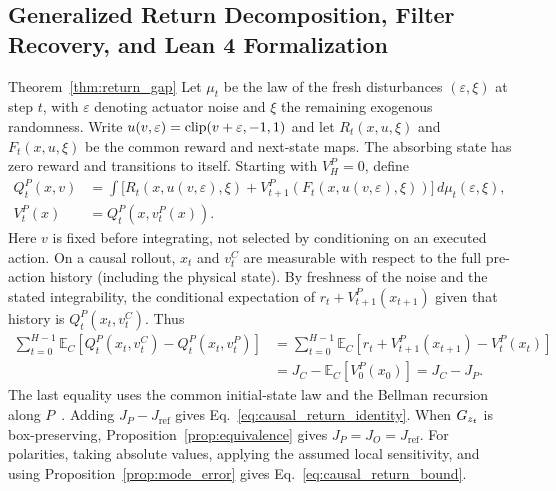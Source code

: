 \subsection{Generalized Return Decomposition, Filter Recovery, and Lean 4 Formalization}
\label{app:return_proof}

\begin{proofof}{Theorem~\ref{thm:return_gap}}
Let $\mu_t$ be the law of the fresh disturbances $(\varepsilon,\xi)$ at step $t$, with $\varepsilon$ denoting actuator noise and $\xi$ the remaining exogenous randomness. Write $u(v,\varepsilon)=\operatorname{clip}(v+\varepsilon,-1,1)$ and let $R_t(x,u,\xi)$ and $F_t(x,u,\xi)$ be the common reward and next-state maps. The absorbing state has zero reward and transitions to itself. Starting with $V_H^P=0$, define
\begin{align*}
 Q_t^P(x,v) &= \int \bigl[R_t(x,u(v,\varepsilon),\xi)
    + V_{t+1}^P(F_t(x,u(v,\varepsilon),\xi))\bigr]\,d\mu_t(\varepsilon,\xi),\\
 V_t^P(x) &= Q_t^P(x,v_t^P(x)).
\end{align*}
Here $v$ is fixed before integrating, not selected by conditioning on an executed action. On a causal rollout, $x_t$ and $v_t^C$ are measurable with respect to the full pre-action history (including the physical state). By freshness of the noise and the stated integrability, the conditional expectation of $r_t+V_{t+1}^P(x_{t+1})$ given that history is $Q_t^P(x_t,v_t^C)$. Thus
\begin{align*}
 \sum_{t=0}^{H-1}\mathbb{E}_C[Q_t^P(x_t,v_t^C)-Q_t^P(x_t,v_t^P)]
 &= \sum_{t=0}^{H-1}\mathbb{E}_C[r_t+V_{t+1}^P(x_{t+1})-V_t^P(x_t)]\\
 &= J_C-\mathbb{E}_C[V_0^P(x_0)] = J_C-J_P.
\end{align*}
The last equality uses the common initial-state law and the Bellman recursion along $P$~\citep{Kakade2002PDL}. Adding $J_P-J_{\mathrm{ref}}$ gives Eq.~\eqref{eq:causal_return_identity}. When $G_{z_t}$ is box-preserving, Proposition~\ref{prop:equivalence} gives $J_P=J_O=J_{\mathrm{ref}}$. For polarities, taking absolute values, applying the assumed local sensitivity, and using Proposition~\ref{prop:mode_error} gives Eq.~\eqref{eq:causal_return_bound}.
\end{proofof}

